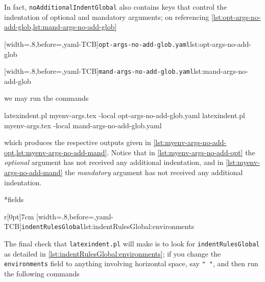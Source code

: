 	In fact, \texttt{noAdditionalIndentGlobal} also contains keys that control the indentation of optional and mandatory
	arguments; on referencing \cref{lst:opt-args-no-add-glob,lst:mand-args-no-add-glob}

	\begin{minipage}{.49\textwidth}
		[width=.8\linewidth,before=\centering,yaml-TCB]{\texttt{opt-args-no-add-glob.yaml}}{lst:opt-args-no-add-glob}
	\end{minipage}
	\hfill
	\begin{minipage}{.49\textwidth}
		[width=.8\linewidth,before=\centering,yaml-TCB]{\texttt{mand-args-no-add-glob.yaml}}{lst:mand-args-no-add-glob}
	\end{minipage}

	we may run the commands
	\begin{commandshell}
latexindent.pl  myenv-args.tex -local opt-args-no-add-glob.yaml
latexindent.pl  myenv-args.tex -local mand-args-no-add-glob.yaml
\end{commandshell}
	which produces the respective outputs given in \cref{lst:myenv-args-no-add-opt,lst:myenv-args-no-add-mand}. Notice that in \cref{lst:myenv-args-no-add-opt}
	the \emph{optional} argument has not received any additional indentation, and in \cref{lst:myenv-args-no-add-mand} the \emph{mandatory} argument
	has not received any additional indentation.

	\begin{minipage}{.45\textwidth}
	\end{minipage}
	\hfill
	\begin{minipage}{.45\textwidth}
	\end{minipage}

*{fields}
	\begin{wrapfigure}[4]{r}[0pt]{7cm}
		[width=.8\linewidth,before=\centering,yaml-TCB]{\texttt{indentRulesGlobal}}{lst:indentRulesGlobal:environments}
	\end{wrapfigure}
	The final check that \texttt{latexindent.pl} will make is to look for \texttt{indentRulesGlobal} as detailed in \cref{lst:indentRulesGlobal:environments}; if you change the \texttt{environments}
	field to anything involving horizontal space, say \lstinline!" "!, and then run the following commands

